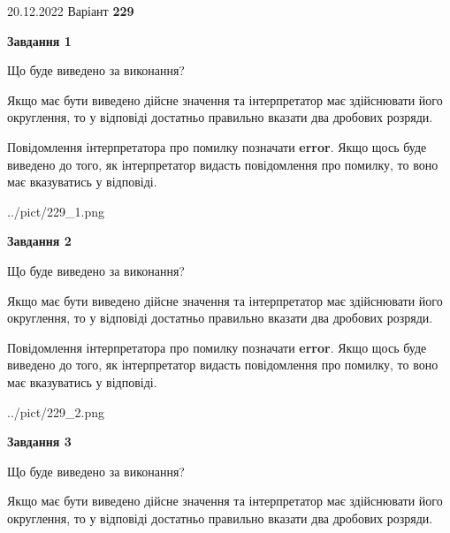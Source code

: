 \documentclass[12pt, ukrainian]{article}
\begin{document}
{20.12.2022 Варіант \No \textbf { 229 }\par}
{
\begin {Large}

{\begin {center}\textbf{Завдання 1}\end {center}}\par
Що буде виведено за виконання? \par

Якщо має бути виведено дійсне значення та інтерпретатор має здійснювати його округлення, 
то у відповіді достатньо правильно вказати два дробових розряди.

Повідомлення інтерпретатора про помилку позначати \textbf{error}.
Якщо щось буде виведено до того, як інтерпретатор видасть повідомлення про помилку, 
то воно має вказуватись у відповіді. \par

\begin{center}
	{../pict/229_1.png}
\end{center}
\newpage

{\begin {center}\textbf{Завдання 2}\end {center}}\par
Що буде виведено за виконання? \par

Якщо має бути виведено дійсне значення та інтерпретатор має здійснювати його округлення, 
то у відповіді достатньо правильно вказати два дробових розряди.

Повідомлення інтерпретатора про помилку позначати \textbf{error}.
Якщо щось буде виведено до того, як інтерпретатор видасть повідомлення про помилку, 
то воно має вказуватись у відповіді. \par

\begin{center}
	{../pict/229_2.png}
\end{center}
\newpage

{\begin {center}\textbf{Завдання 3}\end {center}}\par
Що буде виведено за виконання? \par

Якщо має бути виведено дійсне значення та інтерпретатор має здійснювати його округлення, 
то у відповіді достатньо правильно вказати два дробових розряди.


\end{Large}}
\end{document}
